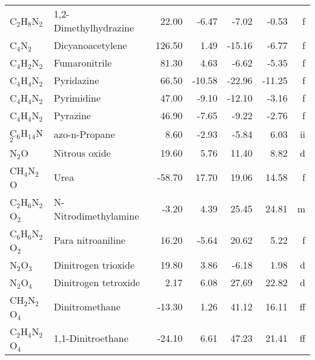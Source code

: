 \begin{table}
\begin{center}
\begin{tabular}{llrrrrr}
 C$_2$H$_8$N$_2$      & 1,2-Dimethylhydrazine           &    22.00    &    -6.47  &    -7.02  &    -0.53  &      f\\
 C$_4$N$_2$        & Dicyanoacetylene                &   126.50    &     1.49  &   -15.16  &    -6.77  &      f\\
 C$_4$H$_2$N$_2$      & Fumaronitrile                   &    81.30    &     4.63  &    -6.62  &    -5.35  &      f\\
 C$_4$H$_4$N$_2$      & Pyridazine                      &    66.50    &   -10.58  &   -22.96  &   -11.25  &      f\\
 C$_4$H$_4$N$_2$      & Pyrimidine                      &    47.00    &    -9.10  &   -12.10  &    -3.16  &      f\\
 C$_4$H$_4$N$_2$      & Pyrazine                        &    46.90    &    -7.65  &    -9.22  &    -2.76  &      f\\
 C$_6$H$_1$$_4$N$_2$     & azo-n-Propane                   &     8.60    &    -2.93  &    -5.84  &     6.03  &     ii\\
 N$_2$O         & Nitrous oxide                   &    19.60    &     5.76  &    11.40  &     8.82  &      d\\
 CH$_4$N$_2$O      & Urea                            &   -58.70    &    17.70  &    19.06  &    14.58  &      f\\
 C$_2$H$_6$N$_2$O$_2$    & N-Nitrodimethylamine            &    -3.20    &     4.39  &    25.45  &    24.81  &      m\\
 C$_6$H$_6$N$_2$O$_2$    & Para nitroaniline               &    16.20    &    -5.64  &    20.62  &     5.22  &      f\\
 N$_2$O$_3$        & Dinitrogen trioxide             &    19.80    &     3.86  &    -6.18  &     1.98  &      d\\
 N$_2$O$_4$        & Dinitrogen tetroxide            &     2.17    &     6.08  &    27.69  &    22.82  &      d\\
 CH$_2$N$_2$O$_4$     & Dinitromethane                  &   -13.30    &     1.26  &    41.12  &    16.11  &     ff\\
 C$_2$H$_4$N$_2$O$_4$    & 1,1-Dinitroethane               &   -24.10    &     6.61  &    47.23  &    21.41  &     ff\\
\hline
\end{tabular}
\end{center}
\end{table}
\clearpage

